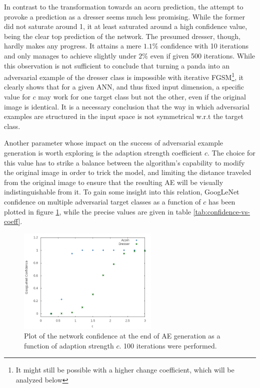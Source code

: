 \documentclass[11pt, a4paper]{article}
\begin{document}
In contrast to the transformation towards an acorn prediction, the attempt to provoke a prediction as a dresser seems much less promising. While the former did not saturate around 1, it at least saturated around a high confidence value, being the clear top prediction of the network. The presumed dresser, though, hardly makes any progress. It attains a mere $1.1\%$ confidence with 10 iterations and only manages to achieve slightly under $2\%$ even if given 500 iterations. While this observation is not sufficient to conclude that turning a panda into an adversarial example of the dresser class is impossible with iterative FGSM\footnote{It might still be possible with a higher change coefficient, which will be analyzed below}, it clearly shows that for a given ANN, and thus fixed input dimension, a specific value for $c$ may work for one target class but not the other, even if the original image is identical. It is a necessary conclusion that the way in which adversarial examples are structured in the input space is not symmetrical w.r.t the target class.

Another parameter whose impact on the success of adversarial example generation is worth exploring is the adaption strength coefficient $c$. The choice for this value has to strike a balance between the algorithm's capability to modify the original image in order to trick the model, and limiting the distance traveled from the original image to ensure that the resulting AE will be visually indistinguishable from it. To gain some insight into this relation, GoogLeNet confidence on multiple adversarial target classes as a function of $c$ has been plotted in figure \ref{fig:confidence-vs-coeff}, while the precise values are given in table \ref{tab:confidence-vs-coeff}.

\begin{figure}[htp]
	\centering
	\includegraphics[width=0.6\textwidth]{images/confidence-vs-coeff.png}
	\caption{Plot of the network confidence at the end of AE generation as a function of adaption strength $c$. 100 iterations were performed.}
	\label{fig:confidence-vs-coeff}
\end{figure}
\end{document}
